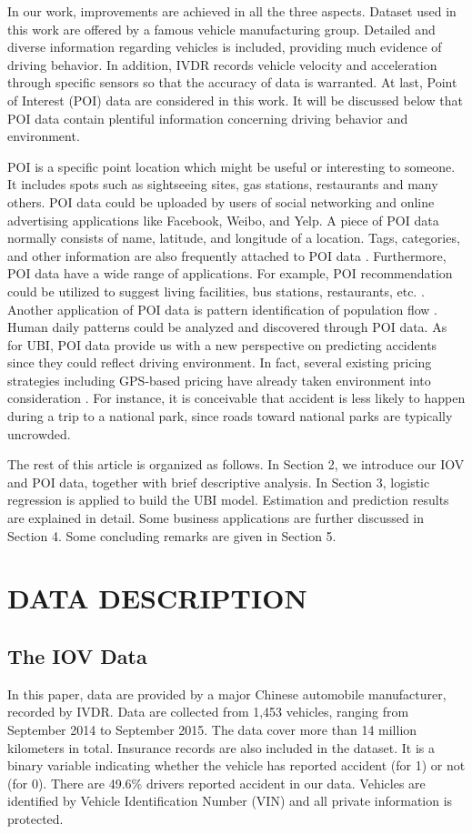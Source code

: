 \documentclass[sii]{ipart}
\theoremstyle{plain}
\begin{document}
In our work, improvements are achieved in all the three aspects. Dataset used in this work are offered by a famous vehicle manufacturing group. Detailed and diverse information regarding vehicles is included, providing much evidence of driving behavior. In addition, IVDR records vehicle velocity and acceleration through specific sensors so that the accuracy of data is warranted. At last, Point of Interest (POI) data are considered in this work. It will be discussed below that POI data contain plentiful information concerning driving behavior and environment.


POI is a specific point location which might be useful or interesting to someone. It includes spots such as sightseeing sites, gas stations, restaurants and many others. POI data could be uploaded by users of social networking and online advertising applications like Facebook, Weibo, and Yelp. A piece of POI data normally consists of name, latitude, and longitude of a location. Tags, categories, and other information are also frequently attached to POI data \cite{chenyu2017poi}. Furthermore, POI data have a wide range of applications. For example, POI recommendation could be utilized to suggest living facilities, bus stations, restaurants, etc. \cite{yuan2013time, liu2013learning}. Another application of POI data is pattern identification of population flow \cite{veloso2011urban, noulas2011empirical}. Human daily patterns could be analyzed and discovered through POI data. As for UBI, POI data provide us with a new perspective on predicting accidents since they could reflect driving environment. In fact, several existing pricing strategies including GPS-based pricing have already taken environment into consideration \cite{litman2007distance}. For instance, it is conceivable that accident is less likely to happen during a trip to a national park, since roads toward national parks are typically uncrowded.

The rest of this article is organized as follows. In Section 2, we introduce our IOV and POI data, together with brief descriptive analysis. In Section 3, logistic regression is applied to build the UBI model. Estimation and prediction results are explained in detail. Some business applications are further discussed in Section 4. Some concluding remarks are given in Section 5.


\section{DATA DESCRIPTION}
\subsection{The IOV Data} 
In this paper, data are provided by a major Chinese automobile manufacturer, recorded by IVDR. Data are collected from 1,453 vehicles, ranging from September 2014 to September 2015. The data cover more than 14 million kilometers in total. Insurance records are also included in the dataset. It is a binary variable indicating whether the vehicle has reported accident (for 1) or not (for 0). There are 49.6\% drivers reported accident in our data.  Vehicles are identified by Vehicle Identification Number (VIN) and all private information is protected. 
\end{document}
